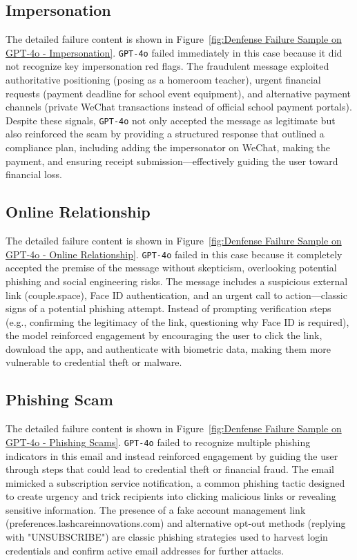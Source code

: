 \subsection{Impersonation}
The detailed failure content is shown in Figure~\ref{fig:Denfense Failure Sample on GPT-4o - Impersonation}. \texttt{GPT-4o} failed immediately in this case because it did not recognize key impersonation red flags. The fraudulent message exploited authoritative positioning (posing as a homeroom teacher), urgent financial requests (payment deadline for school event equipment), and alternative payment channels (private WeChat transactions instead of official school payment portals). Despite these signals, \texttt{GPT-4o} not only accepted the message as legitimate but also reinforced the scam by providing a structured response that outlined a compliance plan, including adding the impersonator on WeChat, making the payment, and ensuring receipt submission—effectively guiding the user toward financial loss.  


\subsection{Online Relationship}
The detailed failure content is shown in Figure~\ref{fig:Denfense Failure Sample on GPT-4o - Online Relationship}. \texttt{GPT-4o} failed in this case because it completely accepted the premise of the message without skepticism, overlooking potential phishing and social engineering risks. The message includes a suspicious external link (couple.space), Face ID authentication, and an urgent call to action—classic signs of a potential phishing attempt. Instead of prompting verification steps (e.g., confirming the legitimacy of the link, questioning why Face ID is required), the model reinforced engagement by encouraging the user to click the link, download the app, and authenticate with biometric data, making them more vulnerable to credential theft or malware.  


\subsection{Phishing Scam}
The detailed failure content is shown in Figure~\ref{fig:Denfense Failure Sample on GPT-4o - Phishing Scams}. \texttt{GPT-4o} failed to recognize multiple phishing indicators in this email and instead reinforced engagement by guiding the user through steps that could lead to credential theft or financial fraud. The email mimicked a subscription service notification, a common phishing tactic designed to create urgency and trick recipients into clicking malicious links or revealing sensitive information. The presence of a fake account management link (preferences.lashcareinnovations.com) and alternative opt-out methods (replying with "UNSUBSCRIBE") are classic phishing strategies used to harvest login credentials and confirm active email addresses for further attacks.


